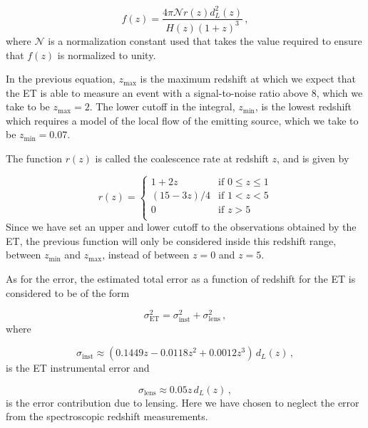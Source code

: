 \begin{equation}
    f(z) = \frac{4 \pi \mathcal{N} r(z) d_L^2(z)}{H(z)(1+z)^3} \,,
\end{equation}
where $\mathcal{N}$ is a normalization constant used that takes the value required to ensure that $f(z)$ is normalized to unity.

In the previous equation, $z_\text{max}$ is the maximum redshift at which we expect that the \gls{ET} is able to measure an event with a signal-to-noise ratio above 8, which we take to be $z_\text{max} = 2$. The lower cutoff in the integral, $z_\text{min}$, is the lowest redshift which requires a model of the local flow of the emitting source, which we take to be $z_\text{min} = 0.07$.

The function $r(z)$ is called the coalescence rate at redshift $z$, and is given by

\begin{equation}
  r(z) =
    \begin{cases}
      1+2z      & \text{if } 0 \leq z \leq 1 \\
      (15-3z)/4 & \text{if } 1 < z < 5       \\
      0         & \text{if } z > 5           \\
    \end{cases}
\end{equation}
Since we have set an upper and lower cutoff to the observations obtained by the \gls{ET}, the previous function will only be considered inside this redshift range, between $z_\text{min}$ and $z_\text{max}$, instead of between $z = 0$ and $z = 5$.

As for the error, the estimated total error as a function of redshift for the \gls{ET} is considered to be of the form

\begin{equation}
    \label{eq:ET-error}
    \sigma^2_\text{ET} = \sigma^2_\text{inst} + \sigma^2_\text{lens} \,,
\end{equation}
where

\begin{equation}
    \sigma_\text{inst} \approx (0.1449z - 0.0118z^2 + 0.0012z^3) \, d_L(z) \,,
\end{equation}
is the ET instrumental error and

\begin{equation}
    \sigma_\text{lens} \approx 0.05 z \, d_L(z) \,,
\end{equation}
is the error contribution due to lensing. Here we have chosen to neglect the error from the spectroscopic redshift measurements.


